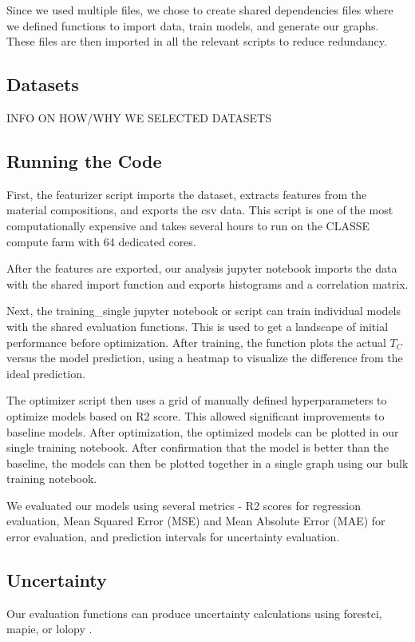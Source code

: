 \documentclass[twocolumn, nofootinbib, secnumarabic, amssymb, nobibnotes, aps, prd]{revtex4-2}
\begin{document}
Since we used multiple files, we chose to create shared dependencies files where we defined functions to import data, train models, and generate our graphs. These files are then imported in all the relevant scripts to reduce redundancy.

\subsection{Datasets}

INFO ON HOW/WHY WE SELECTED DATASETS

\subsection{Running the Code}

First, the featurizer script imports the dataset, extracts features from the material compositions, and exports the csv data. This script is one of the most computationally expensive and takes several hours to run on the CLASSE compute farm with 64 dedicated cores.

After the features are exported, our analysis jupyter notebook imports the data with the shared import function and exports histograms and a correlation matrix. 

Next, the training\_single jupyter notebook or script can train individual models with the shared evaluation functions. This is used to get a landscape of initial performance before optimization. After training, the function plots the actual $T_C$ versus the model prediction, using a heatmap to visualize the difference from the ideal prediction.

The optimizer script then uses a grid of manually defined hyperparameters to optimize models based on R2 score. This allowed significant improvements to baseline models. After optimization, the optimized models can be plotted in our single training notebook. After confirmation that the model is better than the baseline, the models can then be plotted together in a single graph using our bulk training notebook. 

We evaluated our models using several metrics - R2 scores for regression evaluation, Mean Squared Error (MSE) and Mean Absolute Error (MAE) for error evaluation, and prediction intervals for uncertainty evaluation.

\subsection{Uncertainty}\label{sec:uncertainty}
Our evaluation functions can produce uncertainty calculations using forestci, mapie, or lolopy \cite{Polimis2017, Taquet2022, Hutchinson2022}. 
\end{document}

